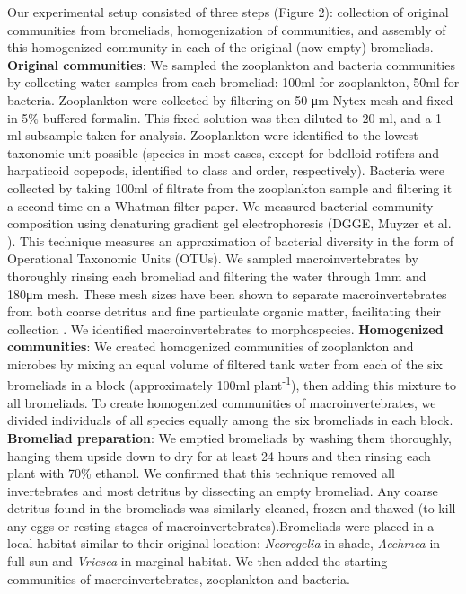 Our experimental setup consisted of three steps (Figure 2): collection
of original communities from bromeliads, homogenization of communities,
and assembly of this homogenized community in each of the original (now
empty) bromeliads. \textbf{Original communities}: We sampled the
zooplankton and bacteria communities by collecting water samples from
each bromeliad: 100ml for zooplankton, 50ml for bacteria. Zooplankton
were collected by filtering on 50 μm Nytex mesh and fixed in 5\%
buffered formalin. This fixed solution was then diluted to 20 ml, and a
1 ml subsample taken for analysis. Zooplankton were identified to the
lowest taxonomic unit possible (species in most cases, except for
bdelloid rotifers and harpaticoid copepods, identified to class and
order, respectively). Bacteria were collected by taking 100ml of
filtrate from the zooplankton sample and filtering it a second time on a
Whatman filter paper. We measured bacterial community composition using
denaturing gradient gel electrophoresis (DGGE, Muyzer et al.
\citeyearpar{Muyzer1993}). This technique measures an approximation of
bacterial diversity in the form of Operational Taxonomic Units (OTUs).
We sampled macroinvertebrates by thoroughly rinsing each bromeliad and
filtering the water through 1mm and 180μm mesh. These mesh sizes have
been shown to separate macroinvertebrates from both coarse detritus and
fine particulate organic matter, facilitating their collection
\citep{Romero2010}. We identified macroinvertebrates to morphospecies.
\textbf{Homogenized communities}: We created homogenized communities of
zooplankton and microbes by mixing an equal volume of filtered tank
water from each of the six bromeliads in a block (approximately 100ml
plant\textsuperscript{-1}), then adding this mixture to all bromeliads.
To create homogenized communities of macroinvertebrates, we divided
individuals of all species equally among the six bromeliads in each
block. \textbf{Bromeliad preparation}: We emptied bromeliads by washing
them thoroughly, hanging them upside down to dry for at least 24 hours
and then rinsing each plant with 70\% ethanol. We confirmed that this
technique removed all invertebrates and most detritus by dissecting an
empty bromeliad. Any coarse detritus found in the bromeliads was
similarly cleaned, frozen and thawed (to kill any eggs or resting stages
of macroinvertebrates).Bromeliads were placed in a local habitat similar
to their original location: \emph{Neoregelia} in shade, \emph{Aechmea}
in full sun and \emph{Vriesea} in marginal habitat. We then added the
starting communities of macroinvertebrates, zooplankton and bacteria.

